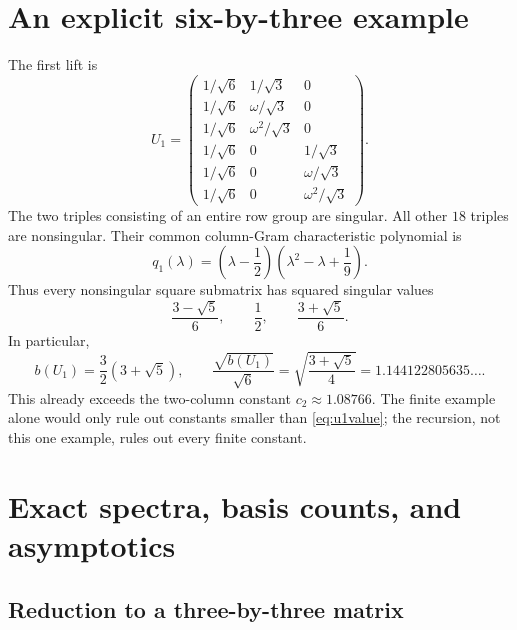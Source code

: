 \documentclass[11pt,letterpaper]{article}
\theoremstyle{definition}
\theoremstyle{remark}
\begin{document}
\section{An explicit six-by-three example}

The first lift is
\begin{equation}
 U_1=
 \begin{pmatrix}
  1/\sqrt6&1/\sqrt3&0\\
  1/\sqrt6&\omega/\sqrt3&0\\
  1/\sqrt6&\omega^2/\sqrt3&0\\
  1/\sqrt6&0&1/\sqrt3\\
  1/\sqrt6&0&\omega/\sqrt3\\
  1/\sqrt6&0&\omega^2/\sqrt3
 \end{pmatrix}.
 \label{eq:u1}
\end{equation}
The two triples consisting of an entire row group are singular. All other $18$ triples are nonsingular. Their common column-Gram characteristic polynomial is
\begin{equation}
 q_1(\lambda)=\left(\lambda-\frac12\right)
 \left(\lambda^2-\lambda+\frac19\right).
 \label{eq:q1}
\end{equation}
Thus every nonsingular square submatrix has squared singular values
\[
 \frac{3-\sqrt5}{6},\qquad \frac12,\qquad \frac{3+\sqrt5}{6}.
\]
In particular,
\begin{equation}
 b(U_1)=\frac32(3+\sqrt5),\qquad
 \frac{\sqrt{b(U_1)}}{\sqrt6}
 =\sqrt{\frac{3+\sqrt5}{4}}
 =1.144122805635\ldots.
 \label{eq:u1value}
\end{equation}
This already exceeds the two-column constant $c_2\approx1.08766$. The finite example alone would only rule out constants smaller than \eqref{eq:u1value}; the recursion, not this one example, rules out every finite constant.

\section{Exact spectra, basis counts, and asymptotics}

\subsection{Reduction to a three-by-three matrix}
\end{document}
